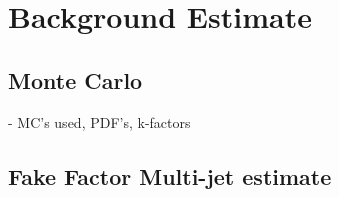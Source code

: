 \chapter{Background Estimate }

\section{Monte Carlo }
{\normalsize - MC's used, PDF's, k-factors}

\section{Fake Factor Multi-jet estimate }

